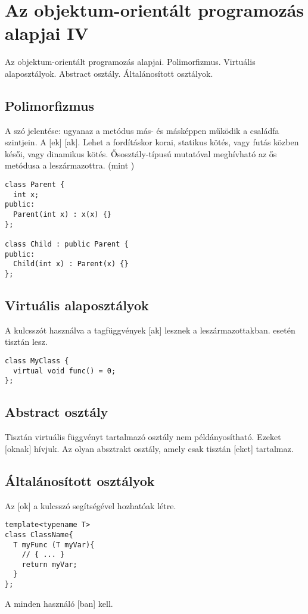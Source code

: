 \documentclass[../../main.tex]{subfiles}
\begin{document}
\section{Az objektum-orientált programozás alapjai IV}

\begin{fulltheorem}
	Az objektum-orientált programozás alapjai. Polimorfizmus. Virtuális
	alaposztályok. Abstract osztály. Általánosított osztályok.
\end{fulltheorem}

\subsection{Polimorfizmus}

A szó jelentése: ugyanaz a metódus más- és másképpen működik a családfa
szintjein. A [ek] [ak]. Lehet a
fordításkor korai, statikus kötés, vagy futás közben késői, vagy dinamikus
kötés. Ősosztály-típusú mutatóval meghívható az ős metódusa a
leszármazottra. (mint )

\begin{verbatim}
class Parent {
  int x;
public:
  Parent(int x) : x(x) {}
};

class Child : public Parent {
public:
  Child(int x) : Parent(x) {}
};
\end{verbatim}

\subsection{Virtuális alaposztályok}

A  kulcsszót használva a tagfüggvények [ak]
lesznek a leszármazottakban.  esetén tisztán  lesz.

\begin{verbatim}
class MyClass {
  virtual void func() = 0;
};
\end{verbatim}

\subsection{Abstract osztály}

Tisztán virtuális függvényt tartalmazó osztály nem példányosítható.
Ezeket [oknak] hívjuk. Az  olyan absztrakt
osztály, amely csak tisztán [eket] tartalmaz.

\subsection{Általánosított osztályok}

Az [ok] a  kulcsszó segítségével
hozhatóak létre.

\begin{verbatim}
template<typename T>
class ClassName{
  T myFunc (T myVar){
    // { ... }
    return myVar;
  }
};
\end{verbatim}

A  minden használó [ban] kell.
\end{document}

